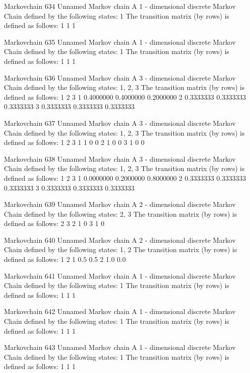 \documentclass[
  nojss]{jss}
\begin{document}
\begin{CodeChunk}
\begin{CodeOutput}
Markovchain  634 
Unnamed Markov chain 
 A  1 - dimensional discrete Markov Chain defined by the following states: 
 1 
 The transition matrix  (by rows)  is defined as follows: 
  1
1 1

Markovchain  635 
Unnamed Markov chain 
 A  1 - dimensional discrete Markov Chain defined by the following states: 
 1 
 The transition matrix  (by rows)  is defined as follows: 
  1
1 1

Markovchain  636 
Unnamed Markov chain 
 A  3 - dimensional discrete Markov Chain defined by the following states: 
 1, 2, 3 
 The transition matrix  (by rows)  is defined as follows: 
          1         2         3
1 0.4000000 0.4000000 0.2000000
2 0.3333333 0.3333333 0.3333333
3 0.3333333 0.3333333 0.3333333

Markovchain  637 
Unnamed Markov chain 
 A  3 - dimensional discrete Markov Chain defined by the following states: 
 1, 2, 3 
 The transition matrix  (by rows)  is defined as follows: 
  1 2 3
1 1 0 0
2 1 0 0
3 1 0 0

Markovchain  638 
Unnamed Markov chain 
 A  3 - dimensional discrete Markov Chain defined by the following states: 
 1, 2, 3 
 The transition matrix  (by rows)  is defined as follows: 
          1         2         3
1 0.0000000 0.2000000 0.8000000
2 0.3333333 0.3333333 0.3333333
3 0.3333333 0.3333333 0.3333333

Markovchain  639 
Unnamed Markov chain 
 A  2 - dimensional discrete Markov Chain defined by the following states: 
 2, 3 
 The transition matrix  (by rows)  is defined as follows: 
  2 3
2 1 0
3 1 0

Markovchain  640 
Unnamed Markov chain 
 A  2 - dimensional discrete Markov Chain defined by the following states: 
 1, 2 
 The transition matrix  (by rows)  is defined as follows: 
    1   2
1 0.5 0.5
2 1.0 0.0

Markovchain  641 
Unnamed Markov chain 
 A  1 - dimensional discrete Markov Chain defined by the following states: 
 1 
 The transition matrix  (by rows)  is defined as follows: 
  1
1 1

Markovchain  642 
Unnamed Markov chain 
 A  1 - dimensional discrete Markov Chain defined by the following states: 
 1 
 The transition matrix  (by rows)  is defined as follows: 
  1
1 1

Markovchain  643 
Unnamed Markov chain 
 A  1 - dimensional discrete Markov Chain defined by the following states: 
 1 
 The transition matrix  (by rows)  is defined as follows: 
  1
1 1


\end{CodeOutput}
\end{CodeChunk}
\end{document}
